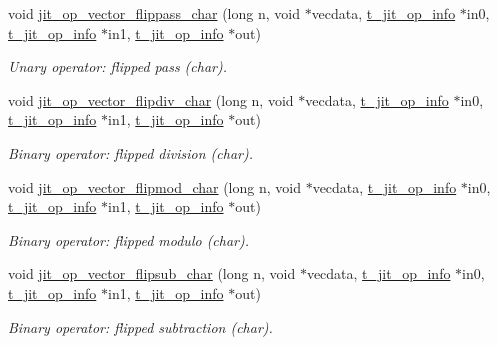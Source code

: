 \begin{DoxyCompactItemize}
void \hyperlink{group__opvecmod_gaec7aba578dcdb7c75b76e8857f57dab7}{jit\_\-op\_\-vector\_\-flippass\_\-char} (long n, void $\ast$vecdata, \hyperlink{structt__jit__op__info}{t\_\-jit\_\-op\_\-info} $\ast$in0, \hyperlink{structt__jit__op__info}{t\_\-jit\_\-op\_\-info} $\ast$in1, \hyperlink{structt__jit__op__info}{t\_\-jit\_\-op\_\-info} $\ast$out)
\begin{DoxyCompactList}\small\item\em Unary operator: flipped pass (char). \item\end{DoxyCompactList}\item 
void \hyperlink{group__opvecmod_ga78061bb22cdd68b8aff44ee2d1a01ce0}{jit\_\-op\_\-vector\_\-flipdiv\_\-char} (long n, void $\ast$vecdata, \hyperlink{structt__jit__op__info}{t\_\-jit\_\-op\_\-info} $\ast$in0, \hyperlink{structt__jit__op__info}{t\_\-jit\_\-op\_\-info} $\ast$in1, \hyperlink{structt__jit__op__info}{t\_\-jit\_\-op\_\-info} $\ast$out)
\begin{DoxyCompactList}\small\item\em Binary operator: flipped division (char). \item\end{DoxyCompactList}\item 
void \hyperlink{group__opvecmod_ga0ac36294ad3e20269d31ef23a27efdb9}{jit\_\-op\_\-vector\_\-flipmod\_\-char} (long n, void $\ast$vecdata, \hyperlink{structt__jit__op__info}{t\_\-jit\_\-op\_\-info} $\ast$in0, \hyperlink{structt__jit__op__info}{t\_\-jit\_\-op\_\-info} $\ast$in1, \hyperlink{structt__jit__op__info}{t\_\-jit\_\-op\_\-info} $\ast$out)
\begin{DoxyCompactList}\small\item\em Binary operator: flipped modulo (char). \item\end{DoxyCompactList}\item 
void \hyperlink{group__opvecmod_ga609e019f00f9ddd83a91a9bfbf0bf78e}{jit\_\-op\_\-vector\_\-flipsub\_\-char} (long n, void $\ast$vecdata, \hyperlink{structt__jit__op__info}{t\_\-jit\_\-op\_\-info} $\ast$in0, \hyperlink{structt__jit__op__info}{t\_\-jit\_\-op\_\-info} $\ast$in1, \hyperlink{structt__jit__op__info}{t\_\-jit\_\-op\_\-info} $\ast$out)
\begin{DoxyCompactList}\small\item\em Binary operator: flipped subtraction (char). \item\end{DoxyCompactList}\item 

\end{DoxyCompactItemize}
